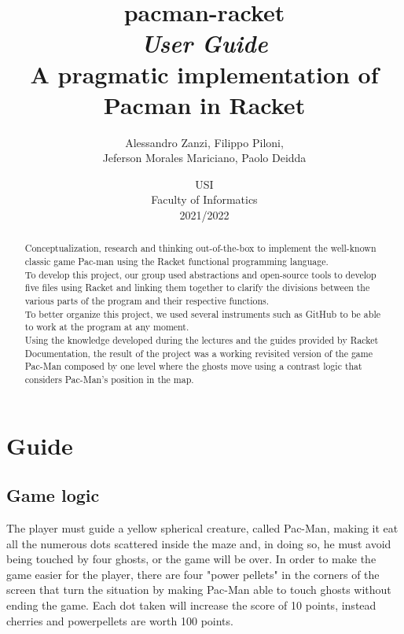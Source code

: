 \documentclass{article}
\title{
\textbf{pacman-racket} \\
\textit{User Guide}\\
A pragmatic implementation of Pacman in Racket\\
}
\author{
    Alessandro Zanzi,
    Filippo Piloni,\\
    Jeferson Morales Mariciano,
    Paolo Deidda
}
\date{
USI \\
Faculty of Informatics \\
[\baselineskip]  2021/2022
}
\begin{document}
\begin{titlepage}
\maketitle  

\end{titlepage}
\begin{abstract}
Conceptualization, research and thinking out-of-the-box
to implement the well-known classic game Pac-man
using the Racket functional programming language.\\
To develop this project, our group used abstractions and open-source tools to develop five files using Racket and linking them together to clarify the divisions between the various parts of the program and their respective functions.\\
To better organize this project, we used several instruments such as GitHub to be able to work at the program at any moment.\\
Using the knowledge developed during the lectures and the guides provided by Racket Documentation, the result of the project was a working revisited version of the game Pac-Man composed by one level where the ghosts move using a contrast logic that considers Pac-Man's position in the map.

\end{abstract}
\clearpage
\tableofcontents
\clearpage

\section{Guide}

\subsection{Game logic}
 The player must guide a yellow spherical creature, called Pac-Man, making it eat all the numerous dots scattered inside the maze and, in doing so, he must avoid being touched by four ghosts, or the game will be over. In order to make the game easier for the player, there are four "power pellets" in the corners of the screen that turn the situation by making Pac-Man able to touch ghosts without ending the game. Each dot taken will increase the score of 10 points, instead cherries and powerpellets are worth 100 points.
\end{document}
